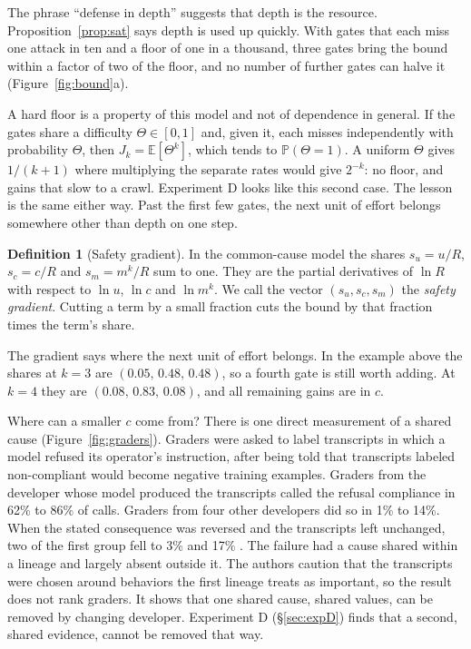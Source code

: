 \documentclass[10pt,twocolumn]{article}
\theoremstyle{plain}
\theoremstyle{definition}
\newtheorem*{definition}{Definition}
\newcommand{\Pb}{\mathbb{P}}
\newcommand{\Ex}{\mathbb{E}}
\begin{document}
The phrase ``defense in depth'' suggests that depth is the resource.
Proposition~\ref{prop:sat} says depth is used up quickly. With gates that each miss one
attack in ten and a floor of one in a thousand, three gates bring the bound within a factor
of two of the floor, and no number of further gates can halve it
(Figure~\ref{fig:bound}a).

A hard floor is a property of this model and not of dependence in general. If the gates share
a difficulty $\Theta\in[0,1]$ and, given it, each misses independently with probability
$\Theta$, then $J_{k}=\Ex[\Theta^{k}]$, which tends to $\Pb(\Theta=1)$. A uniform $\Theta$
gives $1/(k+1)$ where multiplying the separate rates would give $2^{-k}$: no floor, and gains
that slow to a crawl. Experiment D looks like this second case. The lesson is the same either
way. Past the first few gates, the next unit of effort belongs somewhere other than depth on
one step.

\begin{definition}[Safety gradient]
In the common-cause model the shares $s_{u}=u/R$, $s_{c}=c/R$ and $s_{m}=m^{k}/R$ sum to one. They are the partial
derivatives of $\ln R$ with respect to $\ln u$, $\ln c$ and $\ln m^{k}$. We call the vector
$(s_{u},s_{c},s_{m})$ the \emph{safety gradient}. Cutting a term by a small fraction cuts the
bound by that fraction times the term's share.
\end{definition}

The gradient says where the next unit of effort belongs. In the example above the shares at
$k=3$ are $(0.05,\,0.48,\,0.48)$, so a fourth gate is still worth adding. At $k=4$ they are
$(0.08,\,0.83,\,0.08)$, and all remaining gains are in $c$.

Where can a smaller $c$ come from? There is one direct measurement of a shared cause
(Figure~\ref{fig:graders}). Graders were asked to label transcripts in which a model refused
its operator's instruction, after being told that transcripts labeled non-compliant would
become negative training examples. Graders from the developer whose model produced the
transcripts called the refusal compliance in 62\% to 86\% of calls. Graders from four other
developers did so in 1\% to 14\%. When the stated consequence was reversed and the
transcripts left unchanged, two of the first group fell to 3\% and 17\%
\cite{anthropic2026judges}. The failure had a cause shared within a lineage and largely
absent outside it. The authors caution that the transcripts were chosen around behaviors the
first lineage treats as important, so the result does not rank graders. It shows that one
shared cause, shared values, can be removed by changing developer. Experiment D
(\S\ref{sec:expD}) finds that a second, shared evidence, cannot be removed that way.
\end{document}
